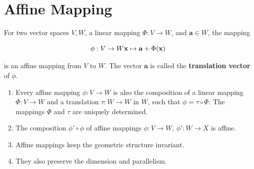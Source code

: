 

\section{Affine Mapping \cite{mfml-1}}\label{Affine Mapping}

For two vector spaces $V, W$, a linear mapping $\Phi : V \to W$, and $\mathbf{a} \in W$, the mapping

\[
    \hfill
    \phi : V \to W
    \hfill
    \mathbf{x} \mapsto \mathbf{a} + \Phi(\mathbf{x})
    \hfill
\]

is an affine mapping from $V$ to $W$. The vector $\mathbf{a}$ is called the \textbf{translation vector} of $\phi$.

\begin{enumerate}
    \item Every affine mapping $\phi : V \to W$ is also the composition of a linear mapping $\Phi : V \to W$ and a translation $\tau : W \to W$ in $W$, such that $\phi = \tau \circ \Phi$. The mappings $\Phi$ and $\tau$ are uniquely determined.

    \item The composition $\phi' \circ \phi$ of affine mappings $\phi : V \to W$, $\phi': W \to X$ is affine.

    \item Affine mappings keep the geometric structure invariant. 
    
    \item They also preserve the dimension and parallelism.
\end{enumerate}














